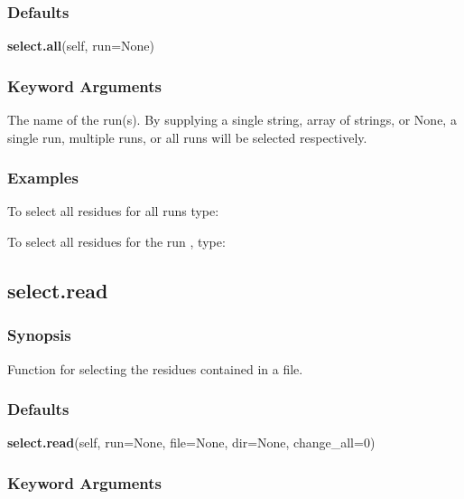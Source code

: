 \subsubsection{Defaults}

\textsf{\textbf{select.all}(self, run=None)}


\subsubsection{Keyword Arguments}


  The name of the run(s).  By supplying a single string, array of strings, or None, a single run, multiple runs, or all runs will be selected respectively.

\subsubsection{Examples}

To select all residues for all runs type:




To select all residues for the run 
, type:





\newpage

\subsection{select.read}


\subsubsection{Synopsis}

Function for selecting the residues contained in a file.

\subsubsection{Defaults}

\textsf{\textbf{select.read}(self, run=None, file=None, dir=None, change\_all=0)}


\subsubsection{Keyword Arguments}


